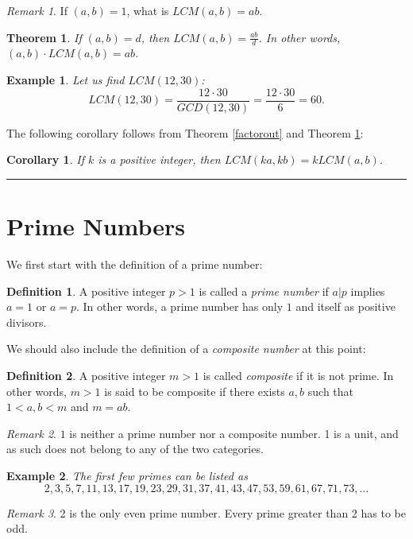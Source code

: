 \documentclass[12pt]{article}
\theoremstyle{plain}
\newtheorem{corollary}{Corollary}
\newtheorem{example}{Example}
\newtheorem{theorem}{Theorem}
\theoremstyle{definition}
\newtheorem{definition}{Definition}
\theoremstyle{remark}
\newtheorem{remark}{Remark}
\begin{document}
\begin{remark}
If $(a,b)=1$, what is $LCM(a,b)=ab$.
\end{remark}

\begin{theorem}\label{gcdlcm}
If $(a,b) = d$, then $LCM(a,b) = \frac{ab}{d}$.
In other words, $(a,b)\cdot LCM(a,b) = ab$.
\end{theorem}

\begin{example} Let us find $LCM(12,30)$:
$$LCM(12, 30) = \frac{12 \cdot 30}{GCD(12,30)} = \frac{12\cdot 30}{6} = 60.$$
\end{example}
The following corollary follows from Theorem \ref{factorout} and Theorem \ref{gcdlcm}:
\begin{corollary}
If $k$ is a positive integer, then  $LCM(ka,kb)=kLCM(a,b)$.
\end{corollary}

\bigskip
\hrule

\section{Prime Numbers}
\bigskip
\noindent
We first start with the definition of a prime number:
\begin{definition}
A positive integer $p>1$ is called a {\it prime number} if $a|p$ implies $a=1$ or $a=p$. In other words, a prime number has only $1$ and itself as positive divisors.
\end{definition}
We should also include the definition of a {\it composite number} at this point:
\begin{definition}
A positive integer $m>1$ is called {\it composite} if it is not prime. In other words, $m>1$ is said to be composite if there exists $a,b $ such that $1<a, b <m$ and $m=ab$.
\end{definition}
\begin{remark}
$1$ is neither a prime number nor a composite number. 1 is a unit, and as such does not belong to any of the two categories.
\end{remark}

\begin{example}
The first few primes can be listed as
$$2, 3, 5, 7, 11, 13, 17, 19, 23, 29, 31, 37, 41, 43, 47, 53, 59, 61, 67, 71, 73, \dots $$
\end{example}
\begin{remark}
2 is the only even prime number. Every prime greater than 2 has to be odd.
\end{remark}
\end{document}
